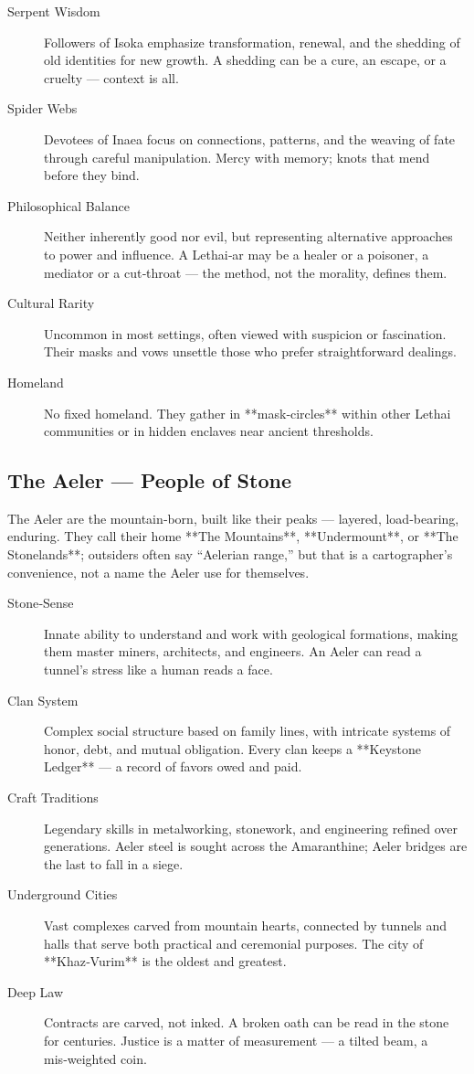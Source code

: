 \begin{description}
\item[Serpent Wisdom] Followers of Isoka emphasize transformation, renewal, and the shedding of old identities for new growth. A shedding can be a cure, an escape, or a cruelty — context is all.
\item[Spider Webs] Devotees of Inaea focus on connections, patterns, and the weaving of fate through careful manipulation. Mercy with memory; knots that mend before they bind.
\item[Philosophical Balance] Neither inherently good nor evil, but representing alternative approaches to power and influence. A Lethai‑ar may be a healer or a poisoner, a mediator or a cut‑throat — the method, not the morality, defines them.
\item[Cultural Rarity] Uncommon in most settings, often viewed with suspicion or fascination. Their masks and vows unsettle those who prefer straightforward dealings.
\item[Homeland] No fixed homeland. They gather in **mask‑circles** within other Lethai communities or in hidden enclaves near ancient thresholds.
\end{description}

\subsection*{The Aeler — People of Stone}
\label{subsec:aeler}

The Aeler are the mountain‑born, built like their peaks — layered, load‑bearing, enduring. They call their home **The Mountains**, **Undermount**, or **The Stonelands**; outsiders often say “Aelerian range,” but that is a cartographer’s convenience, not a name the Aeler use for themselves.

\begin{description}
\item[Stone‑Sense] Innate ability to understand and work with geological formations, making them master miners, architects, and engineers. An Aeler can read a tunnel’s stress like a human reads a face.
\item[Clan System] Complex social structure based on family lines, with intricate systems of honor, debt, and mutual obligation. Every clan keeps a **Keystone Ledger** — a record of favors owed and paid.
\item[Craft Traditions] Legendary skills in metalworking, stonework, and engineering refined over generations. Aeler steel is sought across the Amaranthine; Aeler bridges are the last to fall in a siege.
\item[Underground Cities] Vast complexes carved from mountain hearts, connected by tunnels and halls that serve both practical and ceremonial purposes. The city of **Khaz‑Vurim** is the oldest and greatest.
\item[Deep Law] Contracts are carved, not inked. A broken oath can be read in the stone for centuries. Justice is a matter of measurement — a tilted beam, a mis‑weighted coin.
\end{description}

